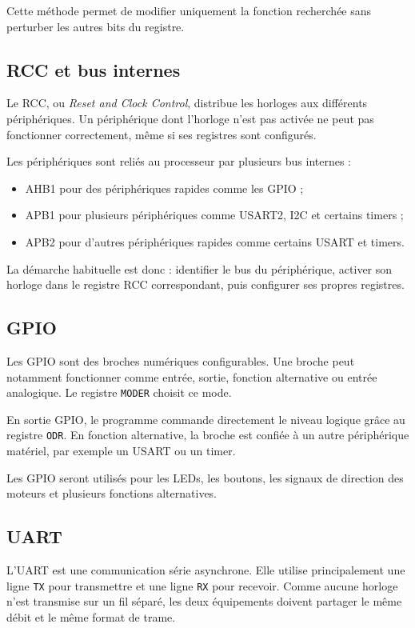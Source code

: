 \documentclass[11pt,a4paper]{article}
\begin{document}
	Cette méthode permet de modifier uniquement la fonction recherchée sans perturber les autres bits du registre.
	
	\subsection*{RCC et bus internes}
	
	Le RCC, ou \textit{Reset and Clock Control}, distribue les horloges aux différents périphériques. Un périphérique dont l'horloge n'est pas activée ne peut pas fonctionner correctement, même si ses registres sont configurés.
	
	Les périphériques sont reliés au processeur par plusieurs bus internes :
	
	\begin{itemize}
		\item AHB1 pour des périphériques rapides comme les GPIO ;
		\item APB1 pour plusieurs périphériques comme USART2, I2C et certains timers ;
		\item APB2 pour d'autres périphériques rapides comme certains USART et timers.
	\end{itemize}
	
	La démarche habituelle est donc : identifier le bus du périphérique, activer son horloge dans le registre RCC correspondant, puis configurer ses propres registres.
	
	\subsection*{GPIO}
	
	Les GPIO sont des broches numériques configurables. Une broche peut notamment fonctionner comme entrée, sortie, fonction alternative ou entrée analogique. Le registre \texttt{MODER} choisit ce mode.
	
	En sortie GPIO, le programme commande directement le niveau logique grâce au registre \texttt{ODR}. En fonction alternative, la broche est confiée à un autre périphérique matériel, par exemple un USART ou un timer.
	
	Les GPIO seront utilisés pour les LEDs, les boutons, les signaux de direction des moteurs et plusieurs fonctions alternatives.
	
	\subsection*{UART}
	
	L'UART est une communication série asynchrone. Elle utilise principalement une ligne \texttt{TX} pour transmettre et une ligne \texttt{RX} pour recevoir. Comme aucune horloge n'est transmise sur un fil séparé, les deux équipements doivent partager le même débit et le même format de trame.
	
\end{document}
